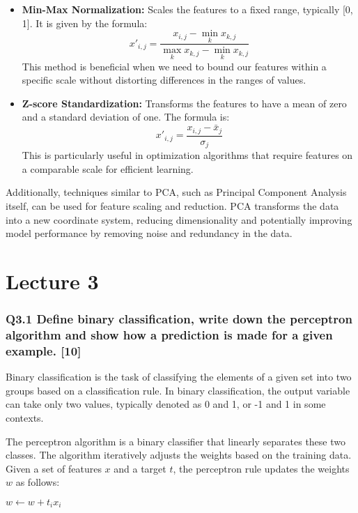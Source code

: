 \documentclass[11pt]{article}
\begin{document}
\begin{itemize}
    \item \textbf{Min-Max Normalization:} Scales the features to a fixed range, typically [0, 1]. It is given by the formula:
    \[
    x'_{i,j} = \frac{x_{i,j} - \min_k x_{k,j}}{\max_k x_{k,j} - \min_k x_{k,j}}
    \]
    This method is beneficial when we need to bound our features within a specific scale without distorting differences in the ranges of values.
    
    \item \textbf{Z-score Standardization:} Transforms the features to have a mean of zero and a standard deviation of one. The formula is:
    \[
    x'_{i,j} = \frac{x_{i,j} - \bar{x}_j}{\sigma_j}
    \]
    This is particularly useful in optimization algorithms that require features on a comparable scale for efficient learning.
\end{itemize}

Additionally, techniques similar to PCA, such as Principal Component Analysis itself, can be used for feature scaling and reduction. PCA transforms the data into a new coordinate system, reducing dimensionality and potentially improving model performance by removing noise and redundancy in the data.


\part{Lecture 3}

\section{Q3.1 Define binary classification, write down the perceptron algorithm and show how a prediction is made for a given example. [10]}

Binary classification is the task of classifying the elements of a given set into two groups based on a classification rule. In binary classification, the output variable can take only two values, typically denoted as 0 and 1, or -1 and 1 in some contexts.

The perceptron algorithm is a binary classifier that linearly separates these two classes. The algorithm iteratively adjusts the weights based on the training data. Given a set of features \( x \) and a target \( t \), the perceptron rule updates the weights \( w \) as follows:

\begin{algorithmic}
    \State \( w \gets w + t_i x_i \)
\EndIf
\end{algorithmic}
\end{document}

